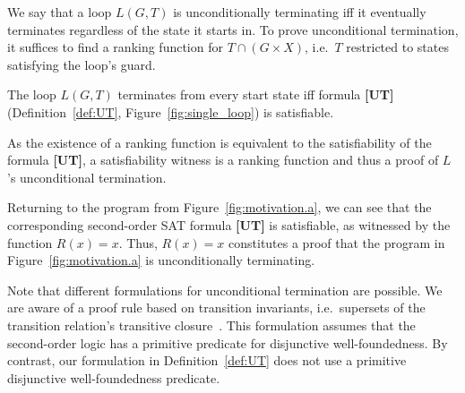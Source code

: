 \documentclass[a4paper]{llncs}
\begin{document}
We say that a loop $L(G, T)$ is unconditionally terminating iff it eventually
terminates regardless of the state it starts in. To prove unconditional termination, it suffices
to find a ranking function for \mbox{$T \cap (G \times X)$}, i.e.~$T$ restricted to states satisfying the loop's guard.


\begin{theorem}
\label{thm:ut}
 The loop $L(G, T)$ terminates from every start state iff formula {\bf [UT]} (Definition~\ref{def:UT}, Figure~\ref{fig:single_loop}) is satisfiable.
\end{theorem}

% 

As the existence of a ranking function is equivalent to the satisfiability
of the formula {\bf [UT]}, a satisfiability witness is a ranking
function and thus a proof of $L$'s unconditional termination.

Returning to the program from Figure~\ref{fig:motivation.a}, we
can see that the corresponding second-order SAT formula {\bf [UT]} is satisfiable,
as witnessed by the function $R(x) = x$.  Thus, $R(x) = x$ constitutes a
proof that the program in Figure~\ref{fig:motivation.a} is unconditionally
terminating.

Note that different formulations for unconditional termination are possible. 
We are aware of a proof rule based on transition invariants, i.e.~supersets
of the transition relation's transitive
closure~\cite{DBLP:conf/pldi/GrebenshchikovLPR12}.  This formulation assumes
that the second-order logic has a primitive predicate for disjunctive
well-foundedness.  By contrast, our formulation in Definition~\ref{def:UT}
does not use a primitive disjunctive well-foundedness predicate.  \\
\end{document}
